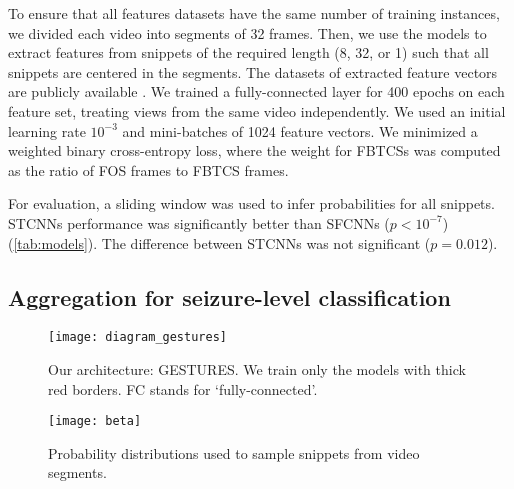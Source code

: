 To ensure that all features datasets have the same number of training instances, we divided each video into segments of 32 frames.
Then, we use the models to extract features from snippets of the required length (8, 32, or 1) such that all snippets are centered in the segments.
The datasets of extracted feature vectors are publicly available \cite{perez-garcia_data_2021}.
We trained a fully-connected layer for 400 epochs on each feature set, treating views from the same video independently.
We used an initial learning rate $10 ^ {-3}$ and mini-batches of 1024 feature vectors.
We minimized a weighted binary cross-entropy loss, where the weight for \acp{FBTCS} was computed as the ratio of \ac{FOS} frames to \ac{FBTCS} frames.

For evaluation, a sliding window was used to infer probabilities for all snippets.
\acp{STCNN} performance was significantly better than \acp{SFCNN} ($p < 10 ^ {-7}$) (\cref{tab:models}).
The difference between \acp{STCNN} was not significant ($p = 0.012$).


\subsection{Aggregation for seizure-level classification}
\label{sec:exp_agg}

\begin{figure}
  \centering
  \texttt{[image: diagram\_gestures]}
  \caption[Overview of the GESTURES architecture]{
    Our architecture: \acf{GESTURES}.
    We train only the models with thick red borders.
    FC stands for `fully-connected'.
  }
  \label{fig:gestures}
\end{figure}



\begin{figure}
  \centering
  \texttt{[image: beta]}
  \caption[Probability distributions to sample snippets from video segments]{
    Probability distributions used to sample snippets from video segments.
  }
  \label{fig:betas}
\end{figure}



